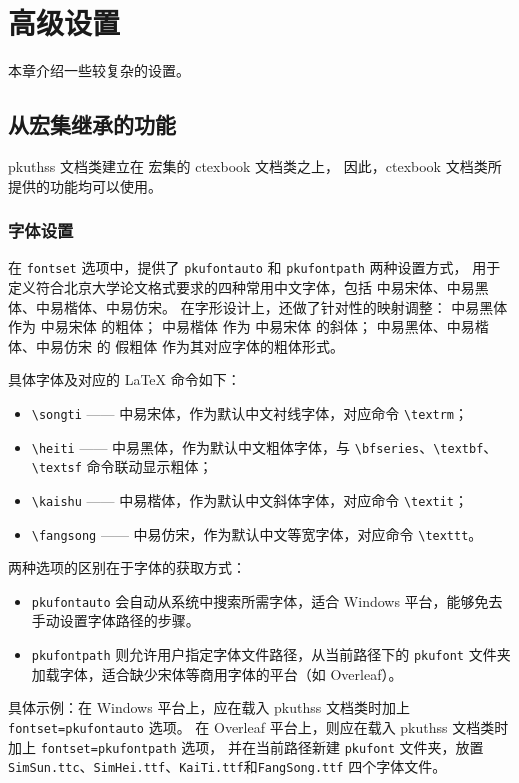 \chapter{高级设置}
本章介绍一些较复杂的设置。

\section{从\CTeX{}宏集继承的功能}
\label{sec:ctex}
pkuthss 文档类建立在 \CTeX{}宏集的 ctexbook\cite{ctex} 文档类之上，
因此，ctexbook 文档类所提供的功能均可以使用。

\subsection{字体设置}

在 \texttt{fontset} 选项中，提供了 \texttt{pkufontauto} 和 \texttt{pkufontpath} 两种设置方式，
用于定义符合北京大学论文格式要求的四种常用中文字体，包括 中易宋体、中易黑体、中易楷体、中易仿宋。
在字形设计上，还做了针对性的映射调整：
中易黑体 作为 中易宋体 的粗体；
中易楷体 作为 中易宋体 的斜体；
中易黑体、中易楷体、中易仿宋 的 假粗体 作为其对应字体的粗体形式。

具体字体及对应的 LaTeX 命令如下：
\begin{itemize}
    \item \verb|\songti| —— 中易宋体，作为默认中文衬线字体，对应命令 \verb|\textrm|；
    \item \verb|\heiti| —— 中易黑体，作为默认中文粗体字体，与 \verb|\bfseries|、\verb|\textbf|、\verb|\textsf| 命令联动显示粗体；
    \item \verb|\kaishu| —— 中易楷体，作为默认中文斜体字体，对应命令 \verb|\textit|；
    \item \verb|\fangsong| —— 中易仿宋，作为默认中文等宽字体，对应命令 \verb|\texttt|。
\end{itemize}

两种选项的区别在于字体的获取方式：
\begin{itemize}
    \item \texttt{pkufontauto} 会自动从系统中搜索所需字体，适合 Windows 平台，能够免去手动设置字体路径的步骤。
    \item \texttt{pkufontpath} 则允许用户指定字体文件路径，从当前路径下的 \texttt{pkufont} 文件夹加载字体，适合缺少宋体等商用字体的平台（如 Overleaf）。
\end{itemize}

具体示例：在 Windows 平台上，应在载入 pkuthss 文档类时加上 \texttt{fontset=pkufontauto} 选项。
在 Overleaf 平台上，则应在载入 pkuthss 文档类时加上 \texttt{fontset=pkufontpath} 选项，
并在当前路径新建 \texttt{pkufont} 文件夹，放置 \texttt{SimSun.ttc}、\texttt{SimHei.ttf}、\texttt{KaiTi.ttf}和\texttt{FangSong.ttf} 四个字体文件。

